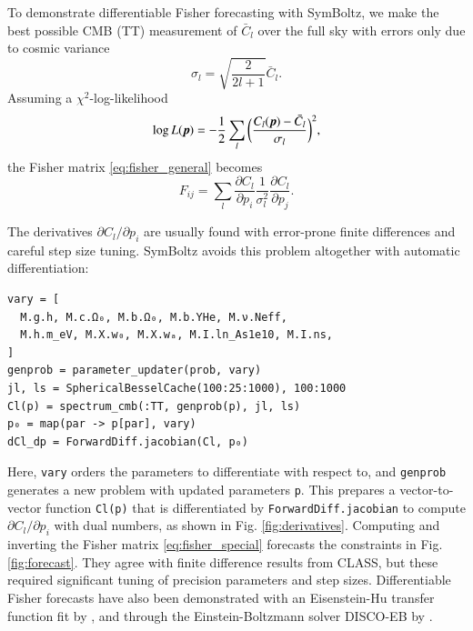 \documentclass{aa}
\begin{document}
To demonstrate differentiable Fisher forecasting with SymBoltz, we make the best possible CMB (TT) measurement of $\bar{C}_l$ over the full sky with errors only due to cosmic variance
\begin{equation}
    \sigma_l = \sqrt{\frac{2}{2l+1}} \bar{C}_l.
\label{eq:cmb_cosmic_variance}
\end{equation}
Assuming a $\chi^2$-log-likelihood
\begin{equation}
    \log L(\boldsymbol{p}) = -\frac12 \sum_l \bigg( \frac{C_l(\boldsymbol{p}) - \bar{C}_l}{\sigma_l} \smash{\bigg)^2} ,
\end{equation}
the Fisher matrix \eqref{eq:fisher_general} becomes
\begin{equation}
    F_{ij} = \sum_l \frac{\partial C_l}{\partial p_i} \frac{1}{\sigma_l^2} \frac{\partial C_l}{\partial p_j} .
\label{eq:fisher_special}
\end{equation}

The derivatives $\partial C_l / \partial p_i$ are usually found with error-prone finite differences and careful step size tuning.
SymBoltz avoids this problem altogether with automatic differentiation:
\begin{codebox}
\begin{Verbatim}
vary = [
  M.g.h, M.c.Ω₀, M.b.Ω₀, M.b.YHe, M.ν.Neff,
  M.h.m_eV, M.X.w₀, M.X.wₐ, M.I.ln_As1e10, M.I.ns,
]
genprob = parameter_updater(prob, vary)
jl, ls = SphericalBesselCache(100:25:1000), 100:1000
Cl(p) = spectrum_cmb(:TT, genprob(p), jl, ls)
p₀ = map(par -> p[par], vary)
dCl_dp = ForwardDiff.jacobian(Cl, p₀)
\end{Verbatim}
\end{codebox}
Here, \texttt{vary} orders the parameters to differentiate with respect to,
and \texttt{genprob} generates a new problem with updated parameters \texttt{p}.
This prepares a vector-to-vector function \texttt{Cl(p)} that is differentiated by \texttt{ForwardDiff.jacobian}
to compute $\partial C_l / \partial p_i$ with dual numbers, as shown in Fig. \ref{fig:derivatives}.
Computing and inverting the Fisher matrix \eqref{eq:fisher_special} forecasts the constraints in Fig. \ref{fig:forecast}.
They agree with finite difference results from CLASS, but these required significant tuning of precision parameters and step sizes.
Differentiable Fisher forecasts have also been demonstrated with an Eisenstein-Hu transfer function fit by \citet{campagneJAXCOSMOEndtoEndDifferentiable2023},
and through the Einstein-Boltzmann solver DISCO-EB by \citet{hahnDISCODJDifferentiableEinsteinBoltzmann2024}.
\end{document}
